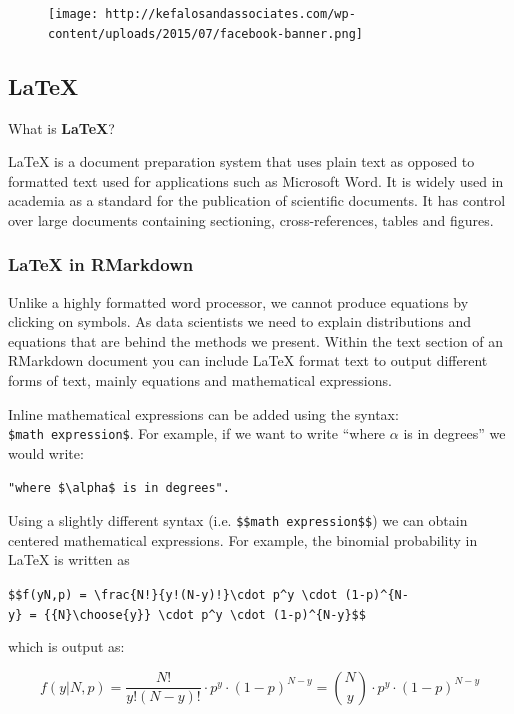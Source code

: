\documentclass[]{book}
\theoremstyle{definition}
\theoremstyle{definition}
\theoremstyle{remark}
\begin{document}
\begin{figure}[htbp]
\centering
\texttt{[image: http://kefalosandassociates.com/wp-content/uploads/2015/07/facebook-banner.png]}
\caption{}
\end{figure}

\subsection{LaTeX}\label{latex}

What is \textbf{LaTeX}?

LaTeX is a document preparation system that uses plain text as opposed
to formatted text used for applications such as Microsoft Word. It is
widely used in academia as a standard for the publication of scientific
documents. It has control over large documents containing sectioning,
cross-references, tables and figures.

\subsubsection{LaTeX in RMarkdown}\label{latex-in-rmarkdown}

Unlike a highly formatted word processor, we cannot produce equations by
clicking on symbols. As data scientists we need to explain distributions
and equations that are behind the methods we present. Within the text
section of an RMarkdown document you can include LaTeX format text to
output different forms of text, mainly equations and mathematical
expressions.

Inline mathematical expressions can be added using the syntax:
\texttt{\$math\ expression\$}. For example, if we want to write ``where
\(\alpha\) is in degrees'' we would write:

\begin{verbatim}
"where $\alpha$ is in degrees".
\end{verbatim}

Using a slightly different syntax (i.e.
\texttt{\$\$math\ expression\$\$}) we can obtain centered mathematical
expressions. For example, the binomial probability in LaTeX is written
as

\texttt{\$\$f(y\textbar{}N,p)\ =\ \textbackslash{}frac\{N!\}\{y!(N-y)!\}\textbackslash{}cdot\ p\^{}y\ \textbackslash{}cdot\ (1-p)\^{}\{N-y\}\ =\ \{\{N\}\textbackslash{}choose\{y\}\}\ \textbackslash{}cdot\ p\^{}y\ \textbackslash{}cdot\ (1-p)\^{}\{N-y\}\$\$}

which is output as:

\[f(y|N,p) = \frac{N!}{y!(N-y)!}\cdot p^y \cdot (1-p)^{N-y} = {{N}\choose{y}} \cdot p^y \cdot (1-p)^{N-y}\]
\end{document}
